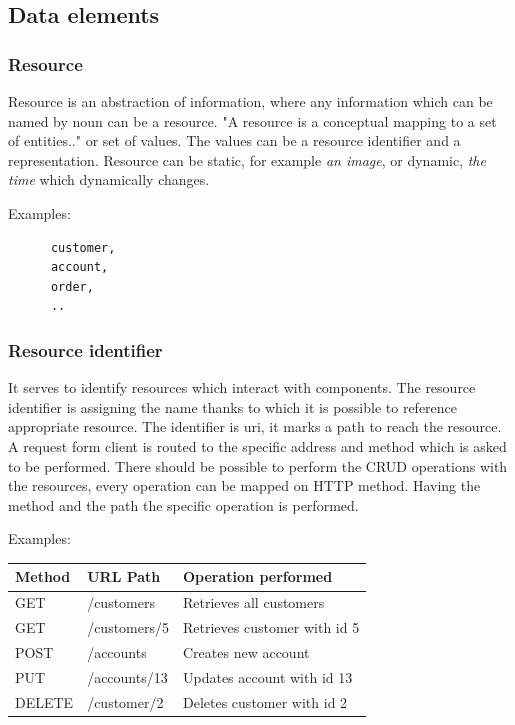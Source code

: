 \subsection{Data elements}
\subsubsection{Resource}
  Resource is an abstraction of information, where any information which can be named by noun can be a resource. "A resource is a conceptual mapping to a set of entities.." \cite{fielding} or set of values. The values can be a resource identifier and a representation.
  Resource can be static, for example \emph{an image}, or dynamic, \emph{the time} which dynamically changes.
  
  Examples:
  \begin{center} 
  \begin{lstlisting}
      customer, 
      account, 
      order, 
      ..
  \end{lstlisting} 
  \end{center}

\subsubsection{Resource identifier}
  It serves to identify resources which interact with components. The resource identifier is assigning the name thanks to which it is possible to reference appropriate resource. The identifier is \gls{uri}, it marks a path to reach the resource. A request form client is routed to the specific address and method which is asked to be performed. 
There should be possible to perform the \gls{CRUD} operations with the resources, every operation can be mapped on HTTP method. Having the method and the path the specific operation is performed.


Examples: \\
\begin{center}
\begin{tabular}{l l l}
Method & URL Path & Operation performed \\ \hline
GET & /customers & Retrieves all customers \\
GET & /customers/5 & Retrieves customer with id 5 \\
POST & /accounts & Creates new account \\
PUT & /accounts/13 & Updates account with id 13 \\
DELETE & /customer/2 & Deletes customer with id 2 \\
\end{tabular}
\end{center}

